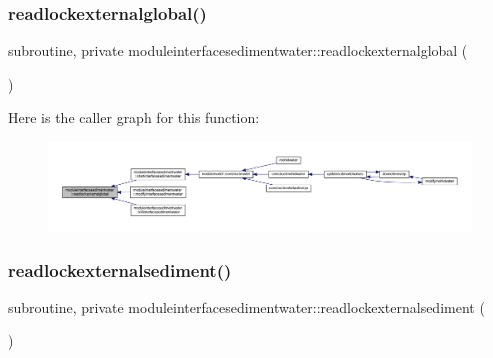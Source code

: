 \subsubsection{\texorpdfstring{readlockexternalglobal()}{readlockexternalglobal()}}
{\footnotesize\ttfamily subroutine, private moduleinterfacesedimentwater\+::readlockexternalglobal (\begin{DoxyParamCaption}{ }\end{DoxyParamCaption})\hspace{0.3cm}{\ttfamily [private]}}

Here is the caller graph for this function\+:\nopagebreak
\begin{figure}[H]
\begin{center}
\leavevmode
\includegraphics[width=350pt]{namespacemoduleinterfacesedimentwater_a4e44b21fdb18ed4d0fbeb1a77a327fff_icgraph}
\end{center}
\end{figure}
\mbox{\label{namespacemoduleinterfacesedimentwater_a0c18da6cbbd1ae812489854544d199b6}} 
\subsubsection{\texorpdfstring{readlockexternalsediment()}{readlockexternalsediment()}}
{\footnotesize\ttfamily subroutine, private moduleinterfacesedimentwater\+::readlockexternalsediment (\begin{DoxyParamCaption}{ }\end{DoxyParamCaption})\hspace{0.3cm}{\ttfamily [private]}}


